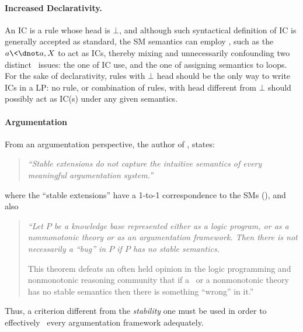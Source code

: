 \documentclass{llncs}
\begin{document}
		\paragraph{{\bf Increased Declarativity.}}\label{subsec:increasedDeclarativity}
			An IC is a rule whose head is $\bot$, and although such syntactical definition of IC is generally accepted as standard, the
			SM semantics can employ \olons, such as the $a\<\dnot a,X$ to act as ICs, thereby mixing and unnecessarily confounding two distinct
			\KR\ issues: the one of IC use, and the one of assigning semantics to loops.
			For the sake of declarativity, rules with $\bot$ head should be the only way to write ICs in a LP: no rule, 
			or combination of rules, with head different from $\bot$ should possibly act as IC(s) under any given semantics.
		\paragraph{{\bf Argumentation}}\label{subsec:modelingArgumentation}
			From an argumentation perspective, the author of \cite{dung95acceptability}, states:
			\begin{quotation}
				{\em ``Stable extensions do not capture the intuitive semantics of every meaningful argumentation system.''}
			\end{quotation}
			where the ``stable extensions'' have a 1-to-1 correspondence to the SMs (\cite{dung95acceptability}), and also
			\begin{quotation}
				{\em ``Let $P$ be a knowledge base represented either as a logic program, or as a nonmonotonic theory or as an argumentation 
						framework. 
						Then there is not necessarily a ``bug'' in $P$ if $P$ has no stable semantics.
						
						This theorem defeats an often held opinion in the logic programming and nonmonotonic reasoning community that if a \lp\ 
						or a nonmonotonic theory has no stable semantics then there is something ``wrong'' in it.''}
			\end{quotation}
			Thus, a criterion different from the \emph{stability} one must be used in order to effectively \m\ every argumentation framework adequately.
\end{document}
